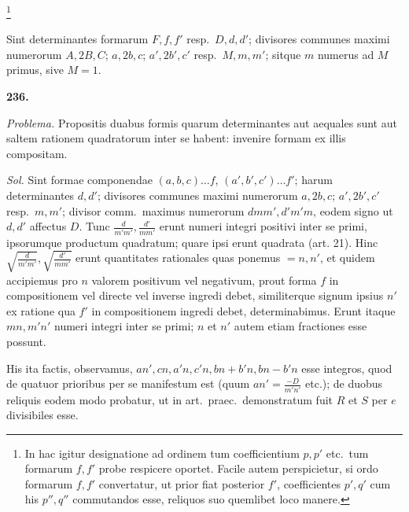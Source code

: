 \documentclass[12pt,a4paper]{article}
\theoremstyle{plain}
\theoremstyle{definition}
\theoremstyle{remark}
\begin{document}
\footnote{In hac igitur designatione ad ordinem tum coefficientium $p, p'$ etc.\ tum formarum $f, f'$ probe respicere oportet. Facile autem perspicietur, si ordo formarum $f, f'$ convertatur, ut prior fiat posterior $f'$, coefficientes $p', q'$ cum his $p'', q''$ commutandos esse, reliquos suo quemlibet loco manere.}

\newpage

Sint determinantes formarum $F, f, f'$ resp.\ $D, d, d'$; divisores communes maximi numerorum $A, 2B, C$; $a, 2b, c$; $a', 2b', c'$ resp.\ $M, m, m'$; sitque $m$ numerus ad $M$ primus, sive $M = 1$.

\textbf{236.}

\textit{Problema.} Propositis duabus formis quarum determinantes aut aequales sunt aut saltem rationem quadratorum inter se habent: invenire formam ex illis compositam.

\textit{Sol.} Sint formae componendae $(a,b,c) \ldots f$, $(a',b',c') \ldots f'$; harum determinantes $d, d'$; divisores communes maximi numerorum $a, 2b, c$; $a', 2b', c'$ resp.\ $m, m'$; divisor comm.\ maximus numerorum $dmm', d'm'm$, eodem signo ut $d, d'$ affectus $D$. Tunc $\tfrac{d}{m'm'}, \tfrac{d'}{mm'}$ erunt numeri integri positivi inter se primi, ipsorumque productum quadratum; quare ipsi erunt quadrata (art. 21). Hinc $\sqrt{\tfrac{d}{m'm'}}, \sqrt{\tfrac{d'}{mm'}}$ erunt quantitates rationales quas ponemus $= n, n'$, et quidem accipiemus pro $n$ valorem positivum vel negativum, prout forma $f$ in compositionem vel directe vel inverse ingredi debet, similiterque signum ipsius $n'$ ex ratione qua $f'$ in compositionem ingredi debet, determinabimus. Erunt itaque $mn, m'n'$ numeri integri inter se primi; $n$ et $n'$ autem etiam fractiones esse possunt.

His ita factis, observamus, $an', cn, a'n, c'n, bn+b'n, bn-b'n$ esse integros, quod de quatuor prioribus per se manifestum est (quum $an' = \tfrac{-D}{m'n'}$ etc.); de duobus reliquis eodem modo probatur, ut in art.\ praec.\ demonstratum fuit $R$ et $S$ per $e$ divisibiles esse.
\end{document}
